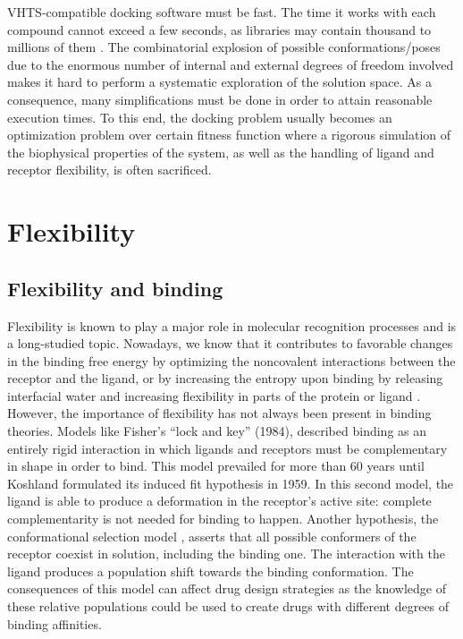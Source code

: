 VHTS-compatible docking software must be fast. The time it works with each compound cannot exceed a few seconds, as libraries may contain thousand to millions of them \cite{schaerfe_critical_2011}. The combinatorial explosion of possible conformations/poses due to the enormous number of internal and external degrees of freedom involved makes it hard to perform a systematic exploration of the solution space. As a consequence, many simplifications must be done in order to attain reasonable execution times. To this end, the docking problem usually becomes an optimization problem over certain fitness function where a rigorous simulation of the biophysical properties of the system, as well as  the handling of ligand and receptor flexibility, is often sacrificed.

\section{Flexibility}

\subsection{Flexibility and binding}

Flexibility is known to play a major role in molecular recognition processes and is a long-studied topic. Nowadays, we know that it contributes to favorable changes in the binding free energy \cite{verkhivker_complexity_2002} by optimizing the noncovalent interactions between the receptor and the ligand, or by increasing the entropy upon binding by releasing interfacial water and increasing flexibility in parts of the protein or ligand \cite{zavodszky_side-chain_2005}. However, the importance of flexibility has not always been present in binding theories. Models like Fisher's ``lock and key'' \cite{fischer_einfluss_????} (1984), described binding as an entirely rigid interaction in which ligands and receptors must be complementary in shape in order to bind. This model prevailed for more than 60 years until Koshland \cite{koshland_application_1958} formulated its induced fit hypothesis in 1959. In this second model, the ligand is able to produce a deformation in the receptor's active site: complete complementarity is not needed for binding to happen. Another hypothesis, the conformational selection model \cite{monod_nature_1965, rubin_nature_1966}, asserts that all possible conformers of the receptor coexist in solution, including the binding one. The interaction with the ligand produces a population shift towards the binding conformation. The consequences of this model can affect drug design strategies as the knowledge of these relative populations could be used to create drugs with different degrees of binding affinities. 

